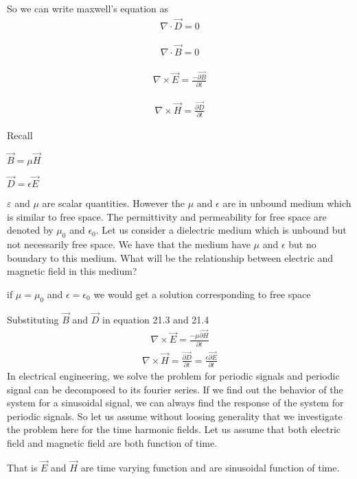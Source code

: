 So we can write maxwell's equation as
\begin{align}
\nabla\cdot\vec{D}=0
\end{align}

\begin{align}
\nabla\cdot\vec{B}=0
\end{align}

\begin{align}
\nabla\times\vec{E}=\frac{-\vec{\partial B}}{\partial t}
\end{align}

\begin{align}
\nabla\times\vec{H}=\frac{\vec{\partial D}}{\partial t}
\end{align}

Recall 

$\vec{B}=\mu\vec{H}$

$\vec{D}=\epsilon\vec{E}$

$\varepsilon$ and $\mu$ are scalar quantities. However the $\mu$ and $\epsilon$ are in unbound medium which is similar to free space. The permittivity and permeability for free space are denoted by $\mu_{0}$ and $\epsilon_{0}$. Let us consider a dielectric medium which is unbound but not necessarily free space. We have that the medium have  $\mu$ and $\epsilon$ but no boundary to this medium. What will be the relationship between electric and magnetic field in this medium? 


if $\mu=\mu_{0}$ and $\epsilon=\epsilon_{0}$ we would get a solution corresponding to free space

Substituting $\vec{B}$ and 	$\vec{D}$ in equation 21.3 and 21.4
\begin{align}
\nabla\times\vec{E}=\frac{-\mu\vec{\partial H}}{\partial t}
\end{align}
\begin{align}
\nabla\times\vec{H}=\frac{\vec{\partial D}}{\partial t}=\frac{\epsilon\vec{\partial E}}{\partial t}
\end{align}
In electrical engineering, we solve the problem for periodic signals and periodic signal can be decomposed to its fourier series. If we find out the behavior of the system for a sinusoidal signal, we can always find the response of the system for periodic signals. So let us assume without loosing generality that we investigate the problem here for the time harmonic fields. Let us assume that both electric field and magnetic field are both function of time.

That is $\vec{E}$ and $\vec{H}$ are time varying function and are sinusoidal function of time.

